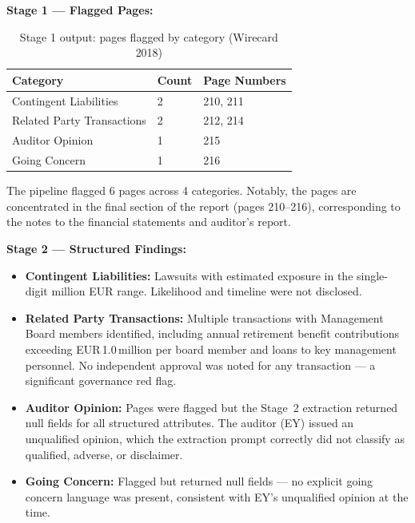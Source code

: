 \documentclass[12pt,a4paper]{article}
\begin{document}
\textbf{Stage 1 --- Flagged Pages:}

\begin{table}[H]
\centering
\begin{tabular}{p{4.5cm} p{1.5cm} p{5cm}}
\toprule
\textbf{Category} & \textbf{Count} & \textbf{Page Numbers} \\
\midrule
Contingent Liabilities & 2 & 210, 211 \\
Related Party Transactions & 2 & 212, 214 \\
Auditor Opinion & 1 & 215 \\
Going Concern & 1 & 216 \\
\bottomrule
\end{tabular}
\caption{Stage 1 output: pages flagged by category (Wirecard 2018)}
\end{table}

\noindent The pipeline flagged 6 pages across 4 categories. Notably, the
pages are concentrated in the final section of the report (pages 210--216),
corresponding to the notes to the financial statements and auditor's report.

\textbf{Stage 2 --- Structured Findings:}

\begin{itemize}[leftmargin=1.5cm]
  \item \textbf{Contingent Liabilities:} Lawsuits with estimated exposure in
    the single-digit million EUR range. Likelihood and timeline were not
    disclosed.

  \item \textbf{Related Party Transactions:} Multiple transactions with
    Management Board members identified, including annual retirement
    benefit contributions exceeding EUR\,1.0\,million per board member
    and loans to key management personnel. No independent approval was
    noted for any transaction --- a significant governance red flag.

  \item \textbf{Auditor Opinion:} Pages were flagged but the Stage~2
    extraction returned null fields for all structured attributes. The
    auditor (EY) issued an unqualified opinion, which the extraction
    prompt correctly did not classify as qualified, adverse, or disclaimer.

  \item \textbf{Going Concern:} Flagged but returned null fields --- no
    explicit going concern language was present, consistent with EY's
    unqualified opinion at the time.
\end{itemize}
\end{document}
